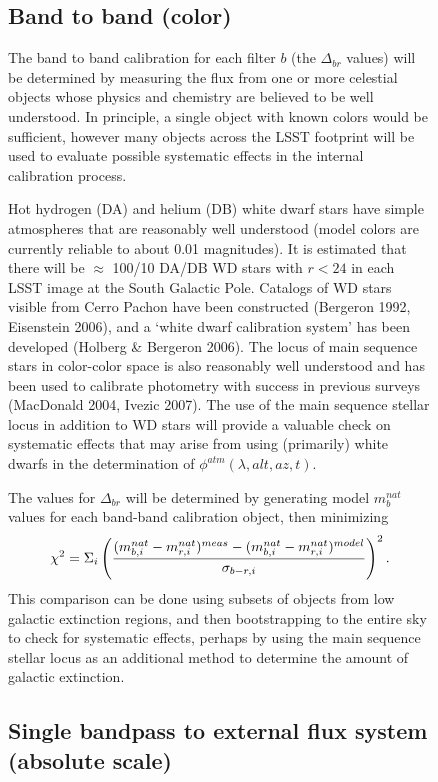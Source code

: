\documentclass[12pt,preprint]{aastex}
\begin{document}
\begin{figure}[htbp]
{\subsection{Band to band (color)}

The band to band calibration for each filter $b$ (the $\Delta_{br}$
values) will be determined by measuring the flux from one or more
celestial objects whose physics and chemistry are believed to be well
understood. In principle, a single object with known colors would be
sufficient, however many objects across the LSST footprint
will be used to evaluate possible systematic effects in the internal
calibration process. 

Hot hydrogen (DA) and helium (DB) white dwarf stars have simple
atmospheres that are reasonably well understood (model colors are
currently reliable to about 0.01 magnitudes). It is estimated that
there will be $\approx$ 100/10 DA/DB WD stars with $r<24$ in each LSST
image at the South Galactic Pole. Catalogs of WD stars visible from
Cerro Pachon have been constructed (Bergeron 1992, Eisenstein
2006), and a `white dwarf calibration system' has been developed
(Holberg \& Bergeron 2006). The locus of main sequence stars in
color-color space is also reasonably well understood and has been used
to calibrate photometry with success in previous surveys (MacDonald
2004, Ivezic 2007). The use of the main sequence stellar locus in addition to
WD stars will provide a valuable check on systematic effects that may
arise from using (primarily) white dwarfs in the determination of
$\phi^{atm}(\lambda,alt,az,t)$. 

The values for $\Delta_{br}$ will be determined by generating model
$m_b^{nat}$ values for each band-band calibration object, then
minimizing 
\begin{equation}
\chi^2 = \Sigma_{i} \left( { (m_{b,i}^{nat} - m_{r,i}^{nat})^{meas} - (m_{b,i}^{nat}
    - m_{r,i}^{nat})^{model} \over  \sigma_{b-r,i}}\right) ^2. 
\end{equation}
This comparison can
be done using subsets of objects from low galactic extinction regions,
and then bootstrapping to the entire sky to check for systematic
effects, perhaps by using the main sequence stellar locus as an
additional method to determine the amount of galactic extinction. 

\subsection{Single bandpass to external flux system (absolute scale)}

}
\end{figure}
\end{document}

